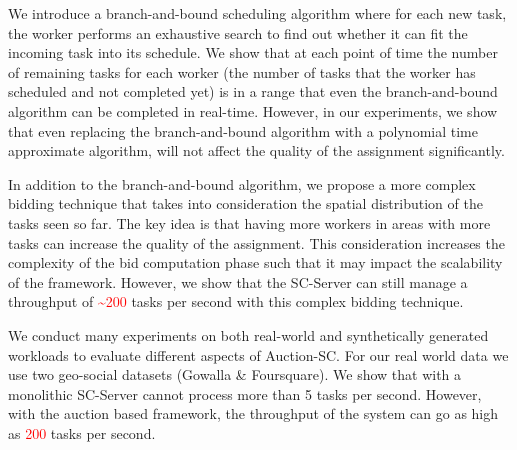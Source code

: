 We introduce a branch-and-bound scheduling algorithm where for each new task, the worker performs an exhaustive search to find out whether it can fit the incoming task into its schedule. We show that at each point of time the number of remaining tasks for each worker (the number of tasks that the worker has scheduled and not completed yet) is in a range that even the branch-and-bound algorithm can be completed in real-time. However, in our experiments, we show that even replacing the branch-and-bound algorithm with a polynomial time approximate algorithm, will not affect the quality of the assignment significantly.

In addition to the branch-and-bound algorithm, we propose a more complex bidding technique that takes into consideration the spatial distribution of the tasks seen so far. The key idea is that having more workers in areas with more tasks can increase the quality of the assignment. This consideration increases the complexity of the bid computation phase such that it may impact the scalability of the framework. However, we show that the SC-Server can still manage a throughput of \textcolor{red}{\textasciitilde 200} tasks per second with this complex bidding technique.


We conduct many experiments on both real-world and synthetically generated workloads to evaluate different aspects of Auction-SC. For our real world data we use two geo-social datasets (Gowalla \& Foursquare). We show that with a monolithic SC-Server cannot process more than 5 tasks per second. However, with the auction based framework, the throughput of the system can go as high as \textcolor{red}{200} tasks per second. 

